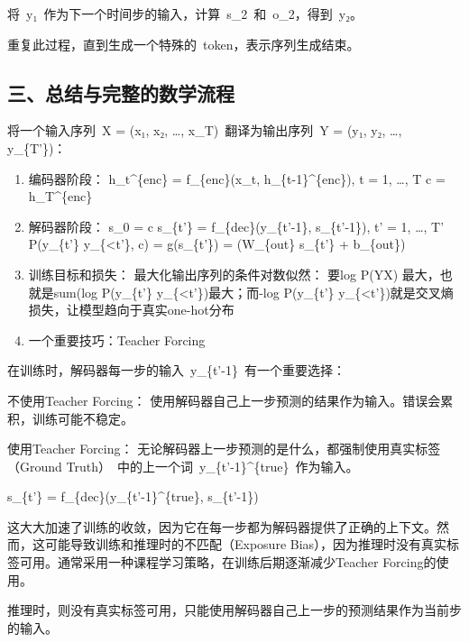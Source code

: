 将~y₁~作为下一个时间步的输入，计算~s\_2~和~o\_2，得到~y₂。

重复此过程，直到生成一个特殊的~token，表示序列生成结束。

\hypertarget{ux4e09ux603bux7ed3ux4e0eux5b8cux6574ux7684ux6570ux5b66ux6d41ux7a0b}{%
\subsection{三、总结与完整的数学流程}\label{ux4e09ux603bux7ed3ux4e0eux5b8cux6574ux7684ux6570ux5b66ux6d41ux7a0b}}

将一个输入序列~X = (x₁, x₂, \ldots, x\_T)~翻译为输出序列~Y = (y₁, y₂, \ldots, y\_\{T'\})：

\begin{enumerate}
\def\labelenumi{\arabic{enumi}.}
\item
  编码器阶段：
  h\_t\^{}\{enc\} = f\_\{enc\}(x\_t, h\_\{t-1\}\^{}\{enc\}), \quad {} t = 1, \ldots, T
  c = h\_T\^{}\{enc\}
\item
  解码器阶段：
  s\_0 = c
  s\_\{t'\} = f\_\{dec\}(y\_\{t'-1\}, s\_\{t'-1\}), \quad {} t' = 1, \ldots, T'
  P(y\_\{t'\} \textbar{} y\_\{\textless t'\}, c) = g(s\_\{t'\}) = (W\_\{out\} s\_\{t'\} + b\_\{out\})
\item
  训练目标和损失：
  最大化输出序列的条件对数似然：
  要log P(Y\textbar X) 最大，也就是sum(log P(y\_\{t'\} \textbar{} y\_\{\textless t'\})最大；而-log P(y\_\{t'\} \textbar{} y\_\{\textless t'\})就是交叉熵损失，让模型趋向于真实one-hot分布
\item
  一个重要技巧：Teacher Forcing
\end{enumerate}

在训练时，解码器每一步的输入~y\_\{t'-1\}~有一个重要选择：

不使用Teacher Forcing： 使用解码器自己上一步预测的结果作为输入。错误会累积，训练可能不稳定。

使用Teacher Forcing： 无论解码器上一步预测的是什么，都强制使用真实标签（Ground Truth）~中的上一个词~y\_\{t'-1\}\^{}\{true\}~作为输入。

s\_\{t'\} = f\_\{dec\}(y\_\{t'-1\}\^{}\{true\}, s\_\{t'-1\})

这大大加速了训练的收敛，因为它在每一步都为解码器提供了正确的上下文。然而，这可能导致训练和推理时的不匹配（Exposure Bias），因为推理时没有真实标签可用。通常采用一种课程学习策略，在训练后期逐渐减少Teacher Forcing的使用。

推理时，则没有真实标签可用，只能使用解码器自己上一步的预测结果作为当前步的输入。

